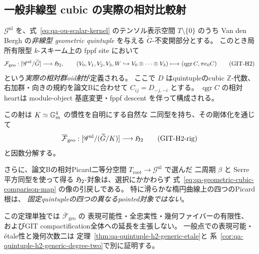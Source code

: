 \subsection{一般非線型 cubic の実際の相対比較射}

\begin{theorem}
\label{thm:qa-geometric-cubic-relative-forgetting}
$\mathscr G^{\mathrm{nl}}$ を、式~\eqref{eq:qa-ou-scalar-kernel}
のテンソル表示空間 $T\setminus\{0\}$ のうち
Van den Bergh の\emph{非線型 geometric quintuple}
を与える $\widetilde G$-不変開部分とする。
このとき局所有限型 $k$-スキーム上の fppf site において
\[
 \mathcal F_{\mathrm{geo}}:
 [\mathscr G^{\mathrm{nl}}/\widetilde G]
 \longrightarrow\mathfrak H_2,\qquad
 (V_0,V_1,V_2,V_3,W\hookrightarrow
       V_0\otimes\cdots\otimes V_3)
 \longmapsto
 (\operatorname{qgr}C,\pi e_0C)
 \tag{GIT-H2}\label{eq:qa-geometric-cubic-comparison-map}
\]
という\emph{実際の相対群oid射}が定義される。
ここで $D$ はquintupleのcubic $\mathbb Z$-代数、
右加群・向きの規約を論文Bに合わせて
$C_{ij}=D_{-j,-i}$ とする。
$\operatorname{qgr}C$ の相対heartは
module-object 基底変更・fppf descent を伴って構成される。

この射は $K\simeq\mathbb G_m^4$ の慣性を自明にする自然な
二同型を持ち、その剛体化を通じて
\[
 \overline{\mathcal F}_{\mathrm{geo}}:
 [\mathscr G^{\mathrm{nl}}/(\widetilde G/K)]
 \longrightarrow\mathfrak H_2
 \tag{GIT-H2-rig}\label{eq:qa-geometric-cubic-rigid-map}
\]
と因数分解する。

さらに、論文Bの相対Picard二等分空間
$T_{\mathrm{root}}\to\mathscr G^{\mathrm{nl}}$ で選んだ
二周期 $\beta$ と Serre 平方同型を使って得る
$\mathfrak H_2$-対象は、選択にかかわらず
式~\eqref{eq:qa-geometric-cubic-comparison-map}
の像の引戻しである。
特に滑らかな楕円曲線上の四つのPicard根は、
\emph{固定quintupleの四つの異なるpointed対象ではない}。

この定理単独では $\overline{\mathcal F}_{\mathrm{geo}}$ の
表現可能性・全忠実性・幾何ファイバーの有限性、
およびGIT compactification全体への延長を主張しない。
一般点での表現可能・étale性と幾何次数二は
定理~\ref{thm:qa-quintuple-h2-generic-etale}と
系~\ref{cor:qa-quintuple-h2-generic-degree-two}で別に証明する。
\end{theorem}
